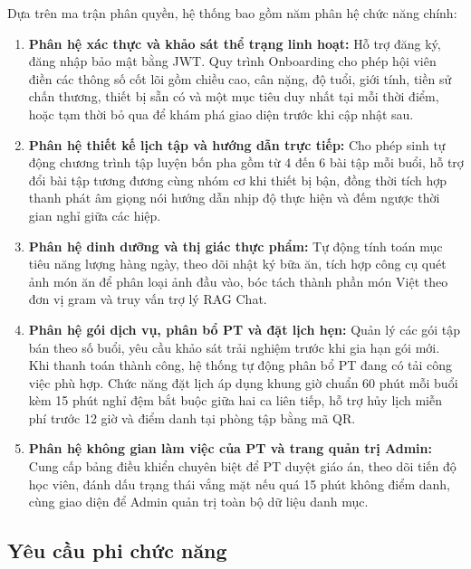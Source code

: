 Dựa trên ma trận phân quyền, hệ thống bao gồm năm phân hệ chức năng chính:
\begin{enumerate}[label=\arabic*)]
    \item \textbf{Phân hệ xác thực và khảo sát thể trạng linh hoạt:} Hỗ trợ đăng ký, đăng nhập bảo mật bằng JWT. Quy trình Onboarding cho phép hội viên điền các thông số cốt lõi gồm chiều cao, cân nặng, độ tuổi, giới tính, tiền sử chấn thương, thiết bị sẵn có và một mục tiêu duy nhất tại mỗi thời điểm, hoặc tạm thời bỏ qua để khám phá giao diện trước khi cập nhật sau.
    \item \textbf{Phân hệ thiết kế lịch tập và hướng dẫn trực tiếp:} Cho phép sinh tự động chương trình tập luyện bốn pha gồm từ 4 đến 6 bài tập mỗi buổi, hỗ trợ đổi bài tập tương đương cùng nhóm cơ khi thiết bị bận, đồng thời tích hợp thanh phát âm giọng nói hướng dẫn nhịp độ thực hiện và đếm ngược thời gian nghỉ giữa các hiệp.
    \item \textbf{Phân hệ dinh dưỡng và thị giác thực phẩm:} Tự động tính toán mục tiêu năng lượng hàng ngày, theo dõi nhật ký bữa ăn, tích hợp công cụ quét ảnh món ăn để phân loại ảnh đầu vào, bóc tách thành phần món Việt theo đơn vị gram và truy vấn trợ lý RAG Chat.
    \item \textbf{Phân hệ gói dịch vụ, phân bổ PT và đặt lịch hẹn:} Quản lý các gói tập bán theo số buổi, yêu cầu khảo sát trải nghiệm trước khi gia hạn gói mới. Khi thanh toán thành công, hệ thống tự động phân bổ PT đang có tải công việc phù hợp. Chức năng đặt lịch áp dụng khung giờ chuẩn 60 phút mỗi buổi kèm 15 phút nghỉ đệm bắt buộc giữa hai ca liên tiếp, hỗ trợ hủy lịch miễn phí trước 12 giờ và điểm danh tại phòng tập bằng mã QR.
    \item \textbf{Phân hệ không gian làm việc của PT và trang quản trị Admin:} Cung cấp bảng điều khiển chuyên biệt để PT duyệt giáo án, theo dõi tiến độ học viên, đánh dấu trạng thái vắng mặt nếu quá 15 phút không điểm danh, cùng giao diện để Admin quản trị toàn bộ dữ liệu danh mục.
\end{enumerate}

\subsection{Yêu cầu phi chức năng}
\label{subsec:yeucau_phichucnang}

